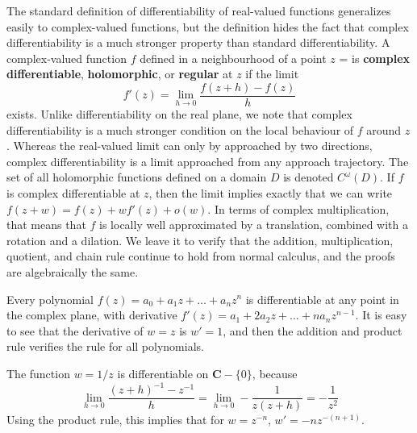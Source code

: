 %
The standard definition of differentiability of real-valued functions generalizes easily to complex-valued functions, but the definition hides the fact that complex differentiability is a much stronger property than standard differentiability. A complex-valued function $f$ defined in a neighbourhood of a point $z$ = is {\bf complex differentiable}, {\bf holomorphic}, or {\bf regular} at $z$ if the limit
%
\[ f'(z) = \lim_{h \to 0} \frac{f(z + h) - f(z)}{h} \]
%
exists. Unlike differentiability on the real plane, we note that complex differentiability is a much stronger condition on the local behaviour of $f$ around $z$. Whereas the real-valued limit can only by approached by two directions, complex differentiability is a limit approached from any approach trajectory. The set of all holomorphic functions defined on a domain $D$ is denoted $C^\omega(D)$. If $f$ is complex differentiable at $z$, then the limit implies exactly that we can write $f(z + w) = f(z) + w f'(z) + o(w)$. In terms of complex multiplication, that means that $f$ is locally well approximated by a translation, combined with a rotation and a dilation. We leave it to verify that the addition, multiplication, quotient, and chain rule continue to hold from normal calculus, and the proofs are algebraically the same.

\begin{example}
    Every polynomial $f(z) = a_0 + a_1z + \dots + a_nz^n$ is differentiable at any point in the complex plane, with derivative $f'(z) = a_1 + 2a_2z + \dots + na_nz^{n-1}$. It is easy to see that the derivative of $w = z$ is $w' = 1$, and then the addition and product rule verifies the rule for all polynomials.
\end{example}

\begin{example}
    The function $w = 1/z$ is differentiable on $\mathbf{C} - \{ 0 \}$, because
    \[ \lim_{h \to 0} \frac{(z + h)^{-1} - z^{-1}}{h} = \lim_{h \to 0} -\frac{1}{z(z+h)} = -\frac{1}{z^2} \]
    Using the product rule, this implies that for $w = z^{-n}$, $w' = -nz^{-(n+1)}$.
\end{example}

